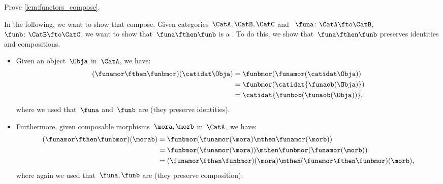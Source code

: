 \begin{exercise}
    Prove \cref{lem:functors_compose}.
\end{exercise}
\begin{solution}
    In the following, we want to show that  compose.
    Given categories~$\CatA,\CatB,\CatC$ and ~$\funa\colon \CatA\fto \CatB$,~$\funb \colon \CatB\fto \CatC$, we want to show that~$\funa\fthen\funb$ is a .
    To do this, we show that~$\funa\fthen\funb$ preserves identities and compositions.
    \begin{itemize}
        \item Given an object~$\Obja$ in~$\CatA$, we have:
              \begin{equation}\label{eq:functor-comp-proof-1}
                  \begin{aligned}
                      (\funamor\fthen\funbmor)(\catidat\Obja)
                       & =\funbmor(\funamor(\catidat\Obja)) \\
                       & =\funbmor(\catidat{\funaob(\Obja)}) \\
                       & =\catidat{\funbob(\funaob(\Obja))},
                  \end{aligned}
              \end{equation}
              where we used that~$\funa$ and~$\funb$ are  (they preserve identities).
        \item Furthermore, given composable morphisms~$\mora,\morb$ in~$\CatA$, we have:
              \begin{equation}\label{eq:functor-comp-proof-2}
                  \begin{aligned}
                      (\funamor\fthen\funbmor)(\morab)
                       & =\funbmor(\funamor(\mora)\mthen \funamor(\morb)) \\
                       & =\funbmor(\funamor(\mora))\mthen \funbmor(\funamor(\morb)) \\
                       & = (\funamor\fthen\funbmor)(\mora) \mthen (\funamor\fthen\funbmor)(\morb),
                  \end{aligned}
              \end{equation}
              where again we used that~$\funa,\funb$ are  (they preserve composition).
    \end{itemize}
\end{solution}

